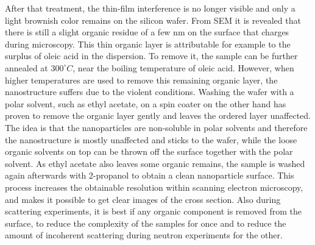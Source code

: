 \documentclass[\main/dresen_thesis.tex]{subfiles}
\begin{document}
  After that treatment, the thin-film interference is no longer visible and only a light brownish color remains on the silicon wafer.
  From SEM it is revealed that there is still a slight organic residue of a few nm on the surface that charges during microscopy.
  This thin organic layer is attributable for example to the surplus of oleic acid in the dispersion.
  To remove it, the sample can be further annealed at $300 ^\circ C$, near the boiling temperature of oleic acid.
  However, when higher temperatures are used to remove this remaining organic layer, the nanostructure suffers due to the violent conditions.
  Washing the wafer with a polar solvent, such as ethyl acetate, on a spin coater on the other hand has proven to remove the organic layer gently and leaves the ordered layer unaffected.
  The idea is that the nanoparticles are non-soluble in polar solvents and therefore the nanostructure is mostly unaffected and sticks to the wafer, while the loose organic solvents on top can be thrown off the surface together with the polar solvent.
  As ethyl acetate also leaves some organic remains, the sample is washed again afterwards with 2-propanol to obtain a clean nanoparticle surface.
  This process increases the obtainable resolution within scanning electron microscopy, and makes it possible to get clear images of the cross section.
  Also during scattering experiments, it is best if any organic component is removed from the surface, to reduce the complexity of the samples for once and to reduce the amount of incoherent scattering during neutron experiments for the other.
\end{document}
